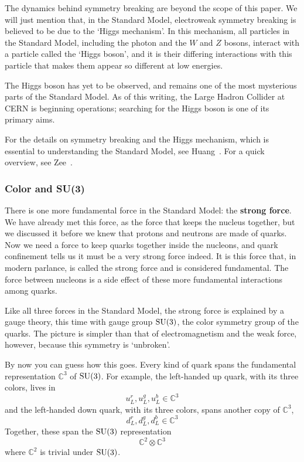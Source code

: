 \documentclass{article}
\newcommand{\C}{{\mathbb C}}  %
\newcommand{\SU}{{\rm SU}}    %
\begin{document}
The dynamics behind symmetry breaking are beyond the scope of this paper. We
will just mention that, in the Standard Model, electroweak symmetry breaking is
believed to be due to the `Higgs mechanism'.  In this mechanism, all
particles in the Standard Model, including the photon and the $W$ and $Z$
bosons, interact with a particle called the `Higgs boson', and it is their
differing interactions with this particle that makes them appear so different
at low energies. 

The Higgs boson has yet to be observed, and remains one of the most mysterious
parts of the Standard Model. As of this writing, the Large Hadron Collider at
CERN is beginning operations; searching for the Higgs boson is one of its
primary aims.

For the details on symmetry breaking and the Higgs mechanism, which is
essential to understanding the Standard Model, see Huang~\cite{huang:qlgf}. For
a quick overview, see Zee~\cite{zee:nutshell}.

\subsubsection{Color and {\rm{SU(3)}}} \label{sec:color}

There is one more fundamental force in the Standard Model: the
\textbf{strong force}. We have already met this force, as the force that
keeps the nucleus together, but we discussed it before we knew that
protons and neutrons are made of quarks.  Now we need a force to keep
quarks together inside the nucleons, and quark confinement tells us it
must be a very strong force indeed.  It is this force that, in modern
parlance, is called the strong force and is considered fundamental. The
force between nucleons is a side effect of these more fundamental
interactions among quarks.

Like all three forces in the Standard Model, the strong force is
explained by a gauge theory, this time with gauge group $\SU(3)$, the
color symmetry group of the quarks.  The picture is simpler than that
of electromagnetism and the weak force, however, because this symmetry
is `unbroken'.  

By now you can guess how this goes. Every kind of quark spans the
fundamental representation $\C^3$ of $\SU(3)$. For example, the
left-handed up quark, with its three colors, lives in
\[ u^r_L, u^g_L, u^b_L \in \C^3 \]
and the left-handed down quark, with its three colors, spans another
copy of $\C^3$,
\[ d^r_L, d^g_L, d^b_L \in \C^3 \]
Together, these span the $\SU(3)$ representation
\[ \C^2 \otimes \C^3 \]
where $\C^2$ is trivial under $\SU(3)$.
\end{document}
